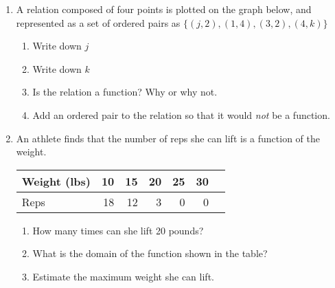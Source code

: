 \documentclass[12pt, twoside]{article}
\begin{document}
\begin{enumerate}
\item A relation composed of four points is plotted on the graph below, and represented as a set of ordered pairs as $\{ (j,2),(1,4),(3,2),(4,k) \}$
\begin{multicols}{2}
\begin{enumerate}
  \item Write down $j$
  \item Write down $k$
  \item Is the relation a function? Why or why not. \vspace{2cm}
  \item Add an ordered pair to the relation so that it would \emph{not} be a function.
\end{enumerate}
  \begin{center} %
  \end{center}
\end{multicols}
\vspace{0.25cm}

\item An athlete finds that the number of reps she can lift is a function of the weight. 
\begin{center}
  \begin{tabular}{|l|r|r|r|r|r|r|}
    \hline
    Weight (lbs) & 10 & 15 & 20 & 25 & 30\\ 
    \hline 
    Reps & 18 & 12 & 3 & 0 & 0\\ 
    \hline 
  \end{tabular}
\end{center}
\begin{enumerate}
  \item How many times can she lift 20 pounds?\vspace{0.25cm}
  \item What is the domain of the function shown in the table?\vspace{0.25cm}
  \item Estimate the maximum weight she can lift.
\end{enumerate}


\end{enumerate}
\end{document}
